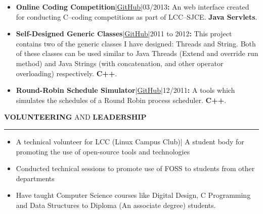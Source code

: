 \documentclass[a4paper, 10pt]{extarticle}
\begin{document}
\begin{large}
\begin{itemize}
    
    \item{\textbf{Online Coding
Competition}|\href{https://github.com/pradeep0605/LCC-SJCE_OnlineCodingWebInterface}{GitHub}|03/2013\textbf{{\Large{:}}}
An web interface created for conducting C--coding competitions as part of
LCC--SJCE. \textbf{Java Servlets}.} 
    \vspace{-.1cm}
    
    \item{\textbf{Self-Designed Generic
Classes}|\href{https://github.com/pradeep0605/GenericClasses}{GitHub}|2011 to
2012\textbf{{\Large{:}}} This project contains two of the generic classes I have
designed: Threads and String. Both of these classes can be used similar to Java
Threads (Extend and override run method) and Java Strings (with concatenation,
and other operator overloading) respectively. \textbf{C++}.} 
    \vspace{-.1cm}
    
    \item{\textbf{Round-Robin Schedule
Simulator}|\href{https://github.com/pradeep0605/RoundRobinScheduleSimulator}{GitHub}|12/2011\textbf{{\Large{:}}}
A tools which simulates the schedules of a Round Robin process scheduler.
\textbf{C++}.} 
    \vspace{-.1cm}    
\end{itemize}
\vspace{.2cm}

\begin{flushleft}
{\LARGE{\textbf{V}}\Large{\textbf{OLUNTEERING}} \large{AND}
\LARGE{\textbf{L}}\Large{\textbf{EADERSHIP}}}
\end{flushleft}
\vspace{-.2cm} \hrule \vspace{-.1cm}

\begin{itemize}
    \item{A technical volunteer for LCC (Linux Campus Club)| A student body for
promoting the use of open-source tools and technologies}
    \vspace{-0.1cm}
    
    \item{Conducted technical sessions to promote use of FOSS to students from
other departments }
    \vspace{-0.1cm}
    
    \item{Have taught Computer Science courses like Digital Design, C
Programming and Data Structures to Diploma (An associate degree) students.}
    \vspace{-0.1cm}
    

\end{itemize}
\end{large}
\end{document}
